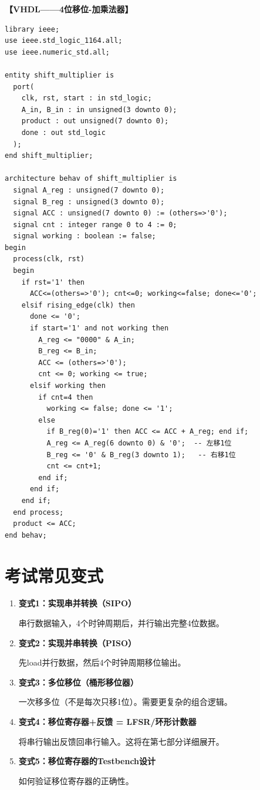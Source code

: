 \textbf{【VHDL——4位移位-加乘法器】}
\begin{lstlisting}
library ieee;
use ieee.std_logic_1164.all;
use ieee.numeric_std.all;

entity shift_multiplier is
  port(
    clk, rst, start : in std_logic;
    A_in, B_in : in unsigned(3 downto 0);
    product : out unsigned(7 downto 0);
    done : out std_logic
  );
end shift_multiplier;

architecture behav of shift_multiplier is
  signal A_reg : unsigned(7 downto 0);
  signal B_reg : unsigned(3 downto 0);
  signal ACC : unsigned(7 downto 0) := (others=>'0');
  signal cnt : integer range 0 to 4 := 0;
  signal working : boolean := false;
begin
  process(clk, rst)
  begin
    if rst='1' then
      ACC<=(others=>'0'); cnt<=0; working<=false; done<='0';
    elsif rising_edge(clk) then
      done <= '0';
      if start='1' and not working then
        A_reg <= "0000" & A_in;
        B_reg <= B_in;
        ACC <= (others=>'0');
        cnt <= 0; working <= true;
      elsif working then
        if cnt=4 then
          working <= false; done <= '1';
        else
          if B_reg(0)='1' then ACC <= ACC + A_reg; end if;
          A_reg <= A_reg(6 downto 0) & '0';  -- 左移1位
          B_reg <= '0' & B_reg(3 downto 1);   -- 右移1位
          cnt <= cnt+1;
        end if;
      end if;
    end if;
  end process;
  product <= ACC;
end behav;
\end{lstlisting}

\section{考试常见变式}

\begin{enumerate}
  \item \textbf{变式1：实现串并转换（SIPO）}

  串行数据输入，4个时钟周期后，并行输出完整4位数据。

  \item \textbf{变式2：实现并串转换（PISO）}

  先load并行数据，然后4个时钟周期移位输出。

  \item \textbf{变式3：多位移位（桶形移位器）}

  一次移多位（不是每次只移1位）。需要更复杂的组合逻辑。

  \item \textbf{变式4：移位寄存器+反馈 = LFSR/环形计数器}

  将串行输出反馈回串行输入。这将在第七部分详细展开。

  \item \textbf{变式5：移位寄存器的Testbench设计}

  如何验证移位寄存器的正确性。
\end{enumerate}


